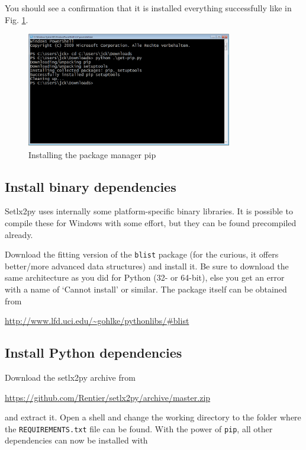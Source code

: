 You should see a confirmation that it is installed everything successfully like in Fig. \ref{fig:install-pip}.

\begin{figure}[ht]
    \centering
    \includegraphics[width=0.8\textwidth]{img/install-pip.png}    
    \caption{Installing the package manager pip}
    \label{fig:install-pip}    
\end{figure}

\subsection{Install binary dependencies}

Setlx2py uses internally some platform-specific binary libraries. It is possible to compile these for Windows with some effort, but they can be found precompiled already. 

Download the fitting version of the \texttt{blist} package (for the curious, it offers better/more advanced data structures) and install it. Be sure to download the same architecture as you did for Python (32- or 64-bit), else you get an error with a name of `Cannot install' or similar. The package itself can be obtained from

\url{http://www.lfd.uci.edu/~gohlke/pythonlibs/#blist}

\subsection{Install Python dependencies}

Download the setlx2py archive from 

\url{https://github.com/Rentier/setlx2py/archive/master.zip}

and extract it. Open a shell and change the working directory to the folder where the \texttt{REQUIREMENTS.txt} file can be found. With the power of \texttt{pip}, all other dependencies can now be installed with 

